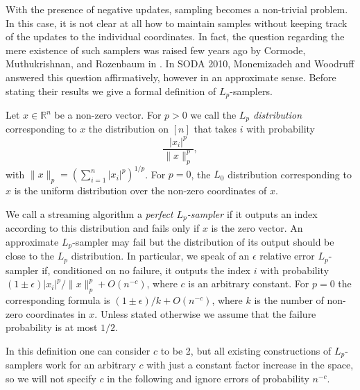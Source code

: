    With the presence of negative updates, sampling becomes a non-trivial problem. In this case,
   it is not clear at all how to maintain samples without keeping track of the updates
    to the individual coordinates. In fact, the question
    regarding the mere existence of such samplers was raised few years ago by Cormode,
    Muthukrishnan, and Rozenbaum in \cite{CormodeMR05}. In SODA 2010, 
    Monemizadeh and Woodruff \cite{MonemizadehW10} answered this question
    affirmatively, however in an approximate sense. Before stating 
     their results we give a formal definition of 
    $L_p$-samplers.

\begin{definition}
Let $x \in \mathbb{R}^n$ be a non-zero vector. For
$p>0$ we call the {\em $L_p$ distribution} corresponding to $x$ the
distribution on $[n]$ that takes $i$ with probability
$$\frac{|x_i|^p}{\|x\|_p^p},$$
with $\|x\|_p=(\sum_{i=1}^n|x_i|^p)^{1/p}$. For $p=0$,
the $L_0$ distribution
corresponding to $x$ is the uniform distribution over the non-zero coordinates
of $x$.
\end{definition}

We call a streaming algorithm a {\em perfect $L_p$-sampler} if it outputs an
index according to this distribution and fails only if $x$ is the zero
vector. An approximate $L_p$-sampler may fail but the distribution of its
output should be close to the $L_p$ distribution. In particular, we speak of an $\epsilon$ relative
error $L_p$-sampler if, conditioned on no failure, it outputs the index $i$
with probability $(1\pm\epsilon)|x_i|^p/\|x\|_p^p+O(n^{-c})$, where $c$ is an
arbitrary constant. For $p=0$ the corresponding formula is
$(1\pm\epsilon)/k+O(n^{-c})$, where $k$ is the number of non-zero coordinates
in $x$. Unless stated otherwise we assume
that the failure probability is at most $1/2$.

In this definition one can consider $c$ to be 2, but all existing
constructions of $L_p$-samplers work for an arbitrary $c$ with just a
constant factor increase in the space, so we will not specify $c$ in the
following and ignore errors of probability $n^{-c}$.
 
